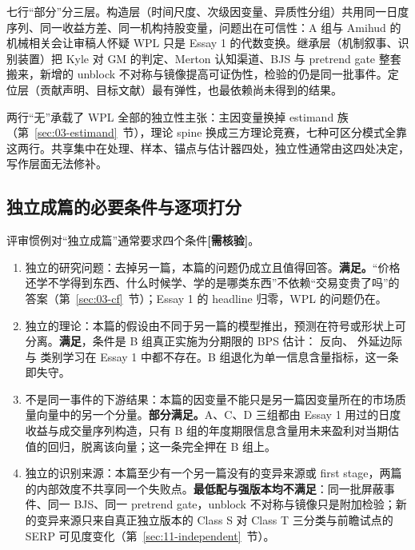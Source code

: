 \documentclass[a4paper,11pt]{ctexart}
\begin{document}
七行“部分”分三层。构造层（时间尺度、次级因变量、异质性分组）共用同一日度序列、同一收益方差、同一机构持股变量，问题出在可信性：A 组与 Amihud 的机械相关会让审稿人怀疑 WPL 只是 Essay 1 的代数变换。继承层（机制叙事、识别装置）把 Kyle 对 GM 的判定、Merton 认知渠道、BJS 与 pretrend gate 整套搬来，新增的 unblock 不对称与镜像提高可证伪性，检验的仍是同一批事件。定位层（贡献声明、目标文献）最有弹性，也最依赖尚未得到的结果。

两行“无”承载了 WPL 全部的独立性主张：主因变量换掉 estimand 族（第~\ref{sec:03-estimand}~节），理论 spine 换成三方理论竞赛，七种可区分模式全靠这两行。共享集中在处理、样本、锚点与估计器四处，独立性通常由这四处决定，写作层面无法修补。

\subsection{独立成篇的必要条件与逐项打分}\label{sec:10-conditions}

评审惯例对“独立成篇”通常要求四个条件\textbf{[需核验]}。

\begin{enumerate}[leftmargin=2em, itemsep=2pt]
\item 独立的研究问题：去掉另一篇，本篇的问题仍成立且值得回答。\textbf{满足。}“价格还学不学得到东西、什么时候学、学的是哪类东西”不依赖“交易变贵了吗”的答案（第~\ref{sec:03-cf}~节）；Essay 1 的 headline 归零，WPL 的问题仍在。

\item 独立的理论：本篇的假设由不同于另一篇的模型推出，预测在符号或形状上可分离。\textbf{满足}，条件是 B 组真正实施为分期限的 BPS 估计：\citet{dugastfoucault2018} 反向、\citet{grossmanstiglitz1980} 外延边际与 \citet{pengxiong2006} 类别学习在 Essay 1 中都不存在。B 组退化为单一信息含量指标，这一条即失守。

\item 不是同一事件的下游结果：本篇的因变量不能只是另一篇因变量所在的市场质量向量中的另一个分量。\textbf{部分满足。}A、C、D 三组都由 Essay 1 用过的日度收益与成交量序列构造，只有 B 组的年度期限信息含量用未来盈利对当期估值的回归，脱离该向量；这一条完全押在 B 组上。

\item 独立的识别来源：本篇至少有一个另一篇没有的变异来源或 first stage，两篇的内部效度不共享同一个失败点。\textbf{最低配与强版本均不满足}：同一批屏蔽事件、同一 BJS、同一 pretrend gate，unblock 不对称与镜像只是附加检验；新的变异来源只来自真正独立版本的 Class S 对 Class T 三分类与前瞻试点的 SERP 可见度变化（第~\ref{sec:11-independent}~节）。
\end{enumerate}
\end{document}
